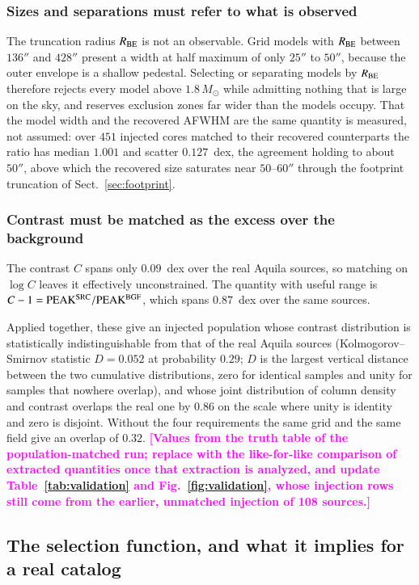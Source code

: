 \documentclass{aa}
\newcommand{\draftnote}[1]{\textcolor{magenta}{\textbf{[#1]}}}
\newcommand{\msun}{M_{\odot}}
\newcommand{\Rbe}{R_{\rm BE}}
\begin{document}
\subsubsection{Sizes and separations must refer to what is observed}
The truncation
radius $\Rbe$ is not an observable. Grid models with $\Rbe$ between $136''$
and $428''$ present a width at half maximum of only $25''$ to $50''$, because
the outer envelope is a shallow pedestal. Selecting or separating models by
$\Rbe$ therefore rejects every model above $1.8\,\msun$ while admitting nothing
that is large on the sky, and reserves exclusion zones far wider than the
models occupy. That the model width and the recovered AFWHM are the same
quantity is measured, not assumed: over $451$ injected cores matched to their
recovered counterparts the ratio has median $1.001$ and scatter $0.127$~dex,
the agreement holding to about $50''$, above which the recovered size
saturates near $50$--$60''$ through the footprint truncation of
Sect.~\ref{sec:footprint}.

\subsubsection{Contrast must be matched as the excess over the background}
The
contrast $C$ spans only $0.09$~dex over the real Aquila sources, so matching
on $\log C$ leaves it effectively unconstrained. The quantity with useful
range is $C-1 = {\rm PEAK^{SRC}}/{\rm PEAK^{BGF}}$, which spans
$0.87$~dex over the same sources.

Applied together, these give an injected population whose contrast
distribution is statistically indistinguishable from that of the real Aquila
sources (Kolmogorov--Smirnov statistic $D=0.052$ at probability $0.29$; $D$ is
the largest vertical distance between the two cumulative distributions, zero
for identical samples and unity for samples that nowhere overlap), and whose
joint distribution of column density and contrast overlaps the real one by
$0.86$ on the scale where unity is identity and zero is disjoint. Without the
four requirements the same grid and the same field give an overlap of $0.32$.
\draftnote{Values from the truth table of the population-matched run;
replace with the like-for-like comparison of extracted quantities once that
extraction is analyzed, and update Table~\ref{tab:validation} and
Fig.~\ref{fig:validation}, whose injection rows still come from the earlier,
unmatched injection of 108 sources.}


\subsection{The selection function, and what it implies for a real catalog}
\label{sec:selection}
\end{document}
